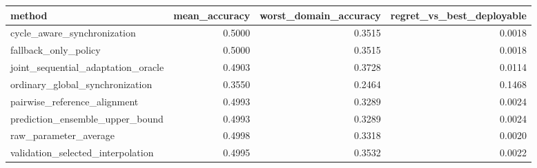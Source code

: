 \begin{tabular}{lrrr}
\toprule
method & mean_accuracy & worst_domain_accuracy & regret_vs_best_deployable \\
\midrule
cycle_aware_synchronization & 0.5000 & 0.3515 & 0.0018 \\
fallback_only_policy & 0.5000 & 0.3515 & 0.0018 \\
joint_sequential_adaptation_oracle & 0.4903 & 0.3728 & 0.0114 \\
ordinary_global_synchronization & 0.3550 & 0.2464 & 0.1468 \\
pairwise_reference_alignment & 0.4993 & 0.3289 & 0.0024 \\
prediction_ensemble_upper_bound & 0.4993 & 0.3289 & 0.0024 \\
raw_parameter_average & 0.4998 & 0.3318 & 0.0020 \\
validation_selected_interpolation & 0.4995 & 0.3532 & 0.0022 \\
\bottomrule
\end{tabular}
